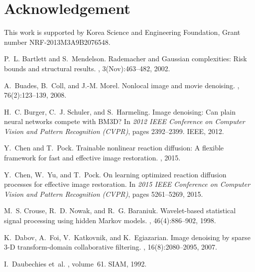 \documentclass[10pt,twocolumn,letterpaper]{article}
\begin{document}
\section{Acknowledgement}

This work is supported by Korea Science and Engineering Foundation, Grant number
NRF-2013M3A9B2076548.





\begin{thebibliography}{10}\itemsep=-1pt

P.~L. Bartlett and S.~Mendelson.
\newblock Rademacher and {G}aussian complexities: {R}isk bounds and structural
  results.
, 3(Nov):463--482, 2002.

A.~Buades, B.~Coll, and J.-M. Morel.
\newblock Nonlocal image and movie denoising.
, 76(2):123--139, 2008.

H.~C. Burger, C.~J. Schuler, and S.~Harmeling.
\newblock Image denoising: Can plain neural networks compete with {BM3D}?
\newblock In {\em 2012 IEEE Conference on Computer Vision and Pattern
  Recognition (CVPR)}, pages 2392--2399. IEEE, 2012.

Y.~Chen and T.~Pock.
\newblock Trainable nonlinear reaction diffusion: A flexible framework for fast
  and effective image restoration.
, 2015.

Y.~Chen, W.~Yu, and T.~Pock.
\newblock On learning optimized reaction diffusion processes for effective
  image restoration.
\newblock In {\em 2015 IEEE Conference on Computer Vision and Pattern
  Recognition (CVPR)}, pages 5261--5269, 2015.

M.~S. Crouse, R.~D. Nowak, and R.~G. Baraniuk.
\newblock Wavelet-based statistical signal processing using hidden {Markov}
  models.
, 46(4):886--902, 1998.

K.~Dabov, A.~Foi, V.~Katkovnik, and K.~Egiazarian.
\newblock Image denoising by sparse {3-D} transform-domain collaborative
  filtering.
, 16(8):2080--2095, 2007.

I.~Daubechies et~al.
, volume~61.
\newblock SIAM, 1992.


\end{thebibliography}
\end{document}
